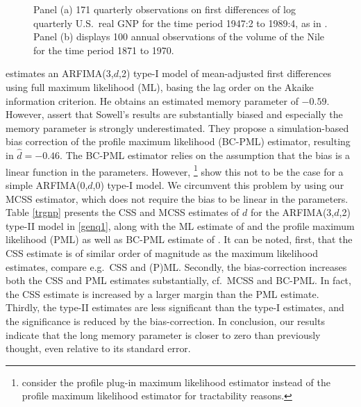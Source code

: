 {{\begin{figure}[H]
  \centering
  \caption{Panel (a) 171 quarterly observations on first differences of log quarterly U.S.\ real GNP for the time period 1947:2 to 1989:4, as in \textcite{sowell1992modeling}. Panel (b) displays 100 annual observations of the
    volume of the Nile for the time period 1871 to 1970.}
  \label{RGNPnile}\end{figure}


\textcite{sowell1992modeling} estimates an ARFIMA(3,$d$,2) type-I model of mean-adjusted first differences using full maximum likelihood (ML), basing the lag order on the Akaike information criterion.  He obtains an estimated
memory parameter of $-0.59$. However, \textcite{smith1997fractional} assert that Sowell's results are substantially biased and especially the memory parameter is strongly underestimated. They propose a simulation-based bias
correction of the profile maximum likelihood (BC-PML) estimator, resulting in $\hat{d} = -0.46$. The BC-PML estimator relies on the assumption that the bias is a linear function in the parameters. However,
\textcite{lieberman2005expansions}\footnote{\textcite{lieberman2005expansions} consider the profile plug-in maximum likelihood estimator instead of the profile maximum likelihood estimator for tractability reasons.}  show this not
to be the case for a simple ARFIMA(0,$d$,0) type-I model. We circumvent this problem by using our MCSS estimator, which does not require the bias to be linear in the parameters. Table \ref{trgnp} presents the CSS and MCSS
estimates of $d$ for the ARFIMA(3,$d$,2) type-II model in \eqref{genq1}, along with the ML estimate of \textcite{sowell1992modeling} and the profile maximum likelihood (PML) as well as BC-PML estimate of
\textcite{smith1997fractional}. It can be noted, first, that the CSS estimate is of similar order of magnitude as the maximum likelihood estimates, compare e.g.\ CSS and (P)ML. Secondly, the bias-correction increases both the CSS
and PML estimates substantially, cf.\ MCSS and BC-PML. In fact, the CSS estimate is increased by a larger margin than the PML estimate. Thirdly, the type-II estimates are less significant than the type-I estimates, and the
significance is reduced by the bias-correction. In conclusion, our results indicate that the long memory parameter is closer to zero than previously thought, even relative to its standard error.


}}
